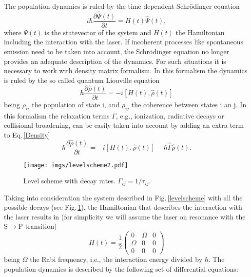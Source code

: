 The population dynamics is ruled by the time dependent Schr\"odinger equation 
\begin{equation}
\label{Schr}
 i\hbar\frac{\partial\hat{\Psi}(t)}{\partial t}=H(t)\hat{\Psi}(t),
\end{equation}
where $\Psi(t)$ is the statevector of the system and $H(t)$ the
Hamiltonian including the interaction with the laser. If incoherent processes like spontaneous emission need to be taken into account, the Schr\"odinger equation no longer provides an adequate description of the dynamics. For such situations it is necessary to work with density matrix formalism. In this formalism the dynamics is ruled by the so called quantum Liouville equation \cite{Sh90}
\begin{equation}
\label{Density}
 \hbar\frac{\partial\hat{\rho}(t)}{\partial t}=-i\left[H(t), \hat{\rho}(t)\right]
\end{equation}
being $\rho_{ii}$ the population of state i, and $\rho_{ij}$ the coherence between states i an j. In this formalism the relaxation terms $\Gamma$, e.g., ionization, radiative decays or collisional broadening, can be easily taken into account by adding an extra term to Eq.\,\ref{Density}
\begin{equation}
\label{Density}
 \hbar\frac{\partial\hat{\rho}(t)}{\partial t}=-i\left[H(t), \hat{\rho}(t)\right]-\hbar\hat{\Gamma}\hat{\rho}(t).
\end{equation}

\begin{figure}[ht!]
\begin{center}
\texttt{[image: imgs/levelscheme2.pdf]}
\caption{\label{levelscheme2} Level scheme with decay rates. $\Gamma_{ij}=1/\tau_{ij}$.}
\end{center}
\end{figure}

Taking into consideration the system described in Fig.\,\ref{levelscheme} with all the possible decays (see Fig.\,\ref{levelscheme2}), the Hamiltonian that describes the interaction with the laser results in (for simplicity we will assume the laser on resonance with the S$\rightarrow$P transition)
\begin{equation}
H(t)=\frac{1}{2}\left(
\begin{matrix} 
0& \Omega & 0  \\
\Omega & 0 & 0   \\
0 & 0 & 0
\end{matrix}
\right)
\end{equation}
being $\Omega$ the Rabi frequency, i.e., the interaction energy divided by $\hbar$. The population dynamics is described by the following set of differential equations:

